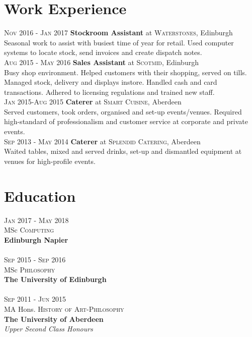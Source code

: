 \documentclass[12pt, a4paper]{article}
\begin{document}
\begin{multicols}{2}
\section{Work Experience}
\textsc{Nov 2016 - Jan 2017} \textbf{Stockroom Assistant}
at \textsc{Waterstones}, Edinburgh\\
Seasonal work to assist with busiest time of year for retail. Used computer systems to locate stock, send invoices and create dispatch notes.\\
\textsc{Aug 2015 - May 2016} \textbf{Sales Assistant}
at \textsc{Scotmid}, Edinburgh\\
Busy shop environment. Helped customers with their shopping, served on tills. Managed stock, delivery and displays instore. Handled cash and card transactions. Adhered to licensing regulations and trained new staff. \\
\textsc{Jan 2015-Aug 2015} \textbf{Caterer}
at \textsc{Smart Cuisine}, Aberdeen\\
Served customers, took orders, organised and set-up events/venues. Required high-standard of professionalism and customer service at corporate and private events.\\
\textsc{Sep 2013 - May 2014} \textbf{Caterer}
at \textsc{Splendid Catering}, Aberdeen\\
Waited tables, mixed and served drinks, set-up and dismantled equipment at venues for high-profile events.

\section{Education}
\textsc{Jan} 2017 - \textsc{May} 2018\\
MSc \textsc{Computing} \\
\textbf{Edinburgh Napier}\\~\\
\textsc{Sep} 2015 - \textsc{Sep} 2016\\
MSc \textsc{Philosophy} \\ 
\textbf{The University of Edinburgh}\\~\\
\textsc{Sep} 2011 - \textsc{Jun} 2015\\
MA Hons. \textsc{History of Art}-\textsc{Philosophy}\\ 
\textbf{The University of Aberdeen}\\ 
\emph{Upper Second Class Honours}\\

\end{multicols}
\end{document}
